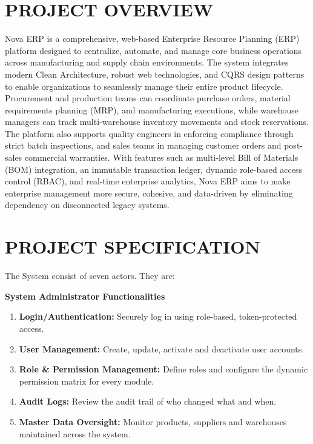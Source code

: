 \documentclass[12pt,a4paper]{report}
\begin{document}
\section{PROJECT OVERVIEW}
Nova ERP is a comprehensive, web-based Enterprise Resource Planning (ERP) platform designed to centralize, automate, and manage core business operations across manufacturing and supply chain environments. The system integrates modern Clean Architecture, robust web technologies, and CQRS design patterns to enable organizations to seamlessly manage their entire product lifecycle. Procurement and production teams can coordinate purchase orders, material requirements planning (MRP), and manufacturing executions, while warehouse managers can track multi-warehouse inventory movements and stock reservations. The platform also supports quality engineers in enforcing compliance through strict batch inspections, and sales teams in managing customer orders and post-sales commercial warranties. With features such as multi-level Bill of Materials (BOM) integration, an immutable transaction ledger, dynamic role-based access control (RBAC), and real-time enterprise analytics, Nova ERP aims to make enterprise management more secure, cohesive, and data-driven by eliminating dependency on disconnected legacy systems.

\section{PROJECT SPECIFICATION}
The System consist of seven actors. They are:

\textbf{System Administrator Functionalities}
\begin{enumerate}
\item \textbf{Login/Authentication:} Securely log in using role-based, token-protected access.
\item \textbf{User Management:} Create, update, activate and deactivate user accounts.
\item \textbf{Role \& Permission Management:} Define roles and configure the dynamic permission matrix for every module.
\item \textbf{Audit Logs:} Review the audit trail of who changed what and when.
\item \textbf{Master Data Oversight:} Monitor products, suppliers and warehouses maintained across the system.
\end{enumerate}
\end{document}
